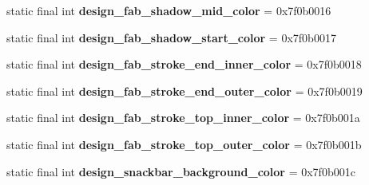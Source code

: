 \begin{DoxyCompactItemize}
\item 
\hypertarget{classandroid_1_1support_1_1design_1_1_r_1_1color_a80ff80abb78cf8c58d69390b7ae713eb}{}static final int {\bfseries design\+\_\+fab\+\_\+shadow\+\_\+mid\+\_\+color} = 0x7f0b0016\label{classandroid_1_1support_1_1design_1_1_r_1_1color_a80ff80abb78cf8c58d69390b7ae713eb}

\item 
\hypertarget{classandroid_1_1support_1_1design_1_1_r_1_1color_ad75b8a513073855f5c7122eb4decf918}{}static final int {\bfseries design\+\_\+fab\+\_\+shadow\+\_\+start\+\_\+color} = 0x7f0b0017\label{classandroid_1_1support_1_1design_1_1_r_1_1color_ad75b8a513073855f5c7122eb4decf918}

\item 
\hypertarget{classandroid_1_1support_1_1design_1_1_r_1_1color_ae422c5b9bdcdfd3f3b12af9ea73d7502}{}static final int {\bfseries design\+\_\+fab\+\_\+stroke\+\_\+end\+\_\+inner\+\_\+color} = 0x7f0b0018\label{classandroid_1_1support_1_1design_1_1_r_1_1color_ae422c5b9bdcdfd3f3b12af9ea73d7502}

\item 
\hypertarget{classandroid_1_1support_1_1design_1_1_r_1_1color_a90f53392b91368cfa9ccc82ddb2f832d}{}static final int {\bfseries design\+\_\+fab\+\_\+stroke\+\_\+end\+\_\+outer\+\_\+color} = 0x7f0b0019\label{classandroid_1_1support_1_1design_1_1_r_1_1color_a90f53392b91368cfa9ccc82ddb2f832d}

\item 
\hypertarget{classandroid_1_1support_1_1design_1_1_r_1_1color_af4c410bd549cf381e12218489c5bd403}{}static final int {\bfseries design\+\_\+fab\+\_\+stroke\+\_\+top\+\_\+inner\+\_\+color} = 0x7f0b001a\label{classandroid_1_1support_1_1design_1_1_r_1_1color_af4c410bd549cf381e12218489c5bd403}

\item 
\hypertarget{classandroid_1_1support_1_1design_1_1_r_1_1color_a06bcbfb568481efb0dad54df0a2ee160}{}static final int {\bfseries design\+\_\+fab\+\_\+stroke\+\_\+top\+\_\+outer\+\_\+color} = 0x7f0b001b\label{classandroid_1_1support_1_1design_1_1_r_1_1color_a06bcbfb568481efb0dad54df0a2ee160}

\item 
\hypertarget{classandroid_1_1support_1_1design_1_1_r_1_1color_a8a804a0e2e3fd52f3c386d672cdffe87}{}static final int {\bfseries design\+\_\+snackbar\+\_\+background\+\_\+color} = 0x7f0b001c\label{classandroid_1_1support_1_1design_1_1_r_1_1color_a8a804a0e2e3fd52f3c386d672cdffe87}


\end{DoxyCompactItemize}
